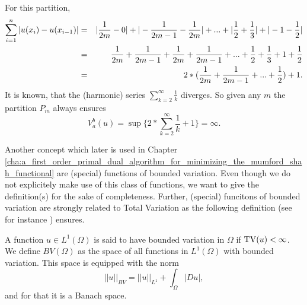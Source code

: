 \begin{example}
\begin{enumerate}
            For this partition,
                \begin{eqnarray}
                    \sum_{i = 1}^{n} |u(x_{i}) - u(x_{i-1})| &=& |\frac{1}{2m} - 0| + |-\frac{1}{2m-1} - \frac{1}{2m}| + ... + |\frac{1}{2} + \frac{1}{3}| + |-1 - \frac{1}{2}| \notag \\
                    &=& \frac{1}{2m} + \frac{1}{2m-1} + \frac{1}{2m} + \frac{1}{2m-1} + ... + \frac{1}{2} + \frac{1}{3} + 1 + \frac{1}{2} \notag \\
                    &=& 2*(\frac{1}{2m} + \frac{1}{2m-1} + ... + \frac{1}{2}) + 1. \notag
                \end{eqnarray}
            It is known, that the (harmonic) series $\sum_{k = 2}^{\infty} \frac{1}{k}$ diverges. So given any $m$ the partition $P_{m}$ always ensures
                $$
                    V^{b}_{a}(u) = \sup \{ 2 * \sum_{k = 2}^{\infty} \frac{1}{k} + 1 \} = \infty.
                $$
        \end{enumerate}

    \end{example}

    Another concept which later is used in Chapter \ref{cha:a_first_order_primal_dual_algorithm_for_minimizing_the_mumford_shah_functional}
    are (special) functions of bounded variation. Even though we do not explicitely make use of this class of functions, we want to give the definition(s) for the sake of completeness. Further, (special) funcitons of bounded variation are strongly related to Total Variation as the following definition (see for instance \cite{Giusti}) ensures.

    \begin{definition}
    \label{def:functions_of_bounded_variation}

        A function $u \in L^{1}(\Omega)$ is said to have bounded variation in $\Omega$ if $\textnormal{TV}(u) < \infty$. We define $BV(\Omega)$ as the space of all functions in $L^{1}(\Omega)$ with bounded variation. This space is equipped with the norm
            $$
                ||u||_{BV} = ||u||_{L^{1}} + \int_{\Omega} |Du|,
            $$
        and for that it is a Banach space.
    
    \end{definition}

